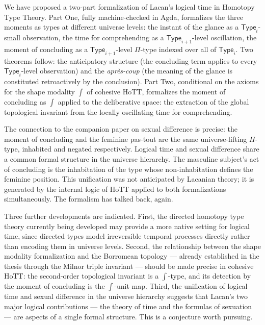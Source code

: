 \documentclass[12pt]{article}
\theoremstyle{definition}
\theoremstyle{remark}
\newcommand{\Type}[1]{\mathsf{Type}_{#1}}
\newcommand{\shapemod}{\int}                    %
\newcommand{\aprescoup}{\textit{apr\`es-coup}}
\begin{document}
We have proposed a two-part formalization of Lacan's logical time in Homotopy Type Theory. Part One, fully machine-checked in Agda, formalizes the three moments as types at different universe levels: the instant of the glance as a $\Type{i}$-small observation, the time for comprehending as a $\Type{i+1}$-level oscillation, the moment of concluding as a $\Type{i+1}$-level $\Pi$-type indexed over all of $\Type{i}$. Two theorems follow: the anticipatory structure (the concluding term applies to every $\Type{i}$-level observation) and the \aprescoup{} (the meaning of the glance is constituted retroactively by the conclusion). Part Two, conditional on the axioms for the shape modality $\shapemod$ of cohesive HoTT, formalizes the moment of concluding as $\shapemod$ applied to the deliberative space: the extraction of the global topological invariant from the locally oscillating time for comprehending.

The connection to the companion paper on sexual difference is precise: the moment of concluding and the feminine pas-tout are the same universe-lifting $\Pi$-type, inhabited and negated respectively. Logical time and sexual difference share a common formal structure in the universe hierarchy. The masculine subject's act of concluding is the inhabitation of the type whose non-inhabitation defines the feminine position. This unification was not anticipated by Lacanian theory; it is generated by the internal logic of HoTT applied to both formalizations simultaneously. The formalism has talked back, again.

Three further developments are indicated. First, the directed homotopy type theory currently being developed \cite{riehl2017} may provide a more native setting for logical time, since directed types model irreversible temporal processes directly rather than encoding them in universe levels. Second, the relationship between the shape modality formalization and the Borromean topology --- already established in the thesis through the Milnor triple invariant --- should be made precise in cohesive HoTT: the second-order topological invariant is a $\shapemod$-type, and its detection by the moment of concluding is the $\shapemod$-unit map. Third, the unification of logical time and sexual difference in the universe hierarchy suggests that Lacan's two major logical contributions --- the theory of time and the formulas of sexuation --- are aspects of a single formal structure. This is a conjecture worth pursuing.

\end{document}
